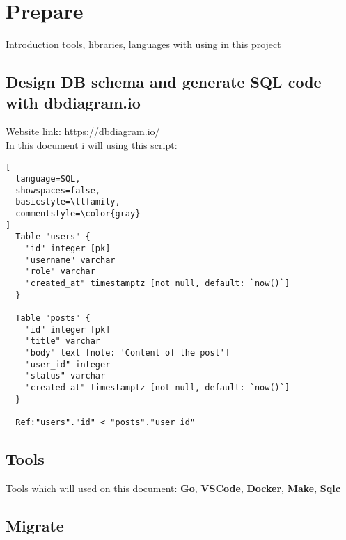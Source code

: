 \documentclass{book}
\begin{document}
\chapter{Prepare}

Introduction tools, libraries, languages with using in this project
\section{Design DB schema and generate SQL code with dbdiagram.io}
Website link: \url{https://dbdiagram.io/} \\
In this document i will using this script:
\begin{lstlisting}[
  language=SQL,
  showspaces=false,
  basicstyle=\ttfamily,
  commentstyle=\color{gray}
]
  Table "users" {
    "id" integer [pk]
    "username" varchar
    "role" varchar
    "created_at" timestamptz [not null, default: `now()`]
  }

  Table "posts" {
    "id" integer [pk]
    "title" varchar
    "body" text [note: 'Content of the post']
    "user_id" integer
    "status" varchar
    "created_at" timestamptz [not null, default: `now()`]
  }

  Ref:"users"."id" < "posts"."user_id"
\end{lstlisting}

\section{Tools}
Tools which will used on this document: \textbf{Go}, \textbf{VSCode}, \textbf{Docker}, \textbf{Make}, \textbf{Sqlc}
\section{Migrate}

\end{document}
